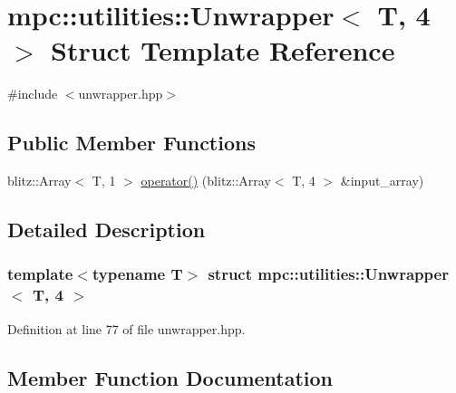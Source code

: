 \hypertarget{structmpc_1_1utilities_1_1_unwrapper_3_01_t_00_014_01_4}{}\section{mpc\+:\+:utilities\+:\+:Unwrapper$<$ T, 4 $>$ Struct Template Reference}
\label{structmpc_1_1utilities_1_1_unwrapper_3_01_t_00_014_01_4}


{\ttfamily \#include $<$unwrapper.\+hpp$>$}

\subsection*{Public Member Functions}
\begin{DoxyCompactItemize}
\item 
blitz\+::\+Array$<$ T, 1 $>$ \mbox{\hyperlink{structmpc_1_1utilities_1_1_unwrapper_3_01_t_00_014_01_4_a288f292a07352d80d6ea251b01b0a006}{operator()}} (blitz\+::\+Array$<$ T, 4 $>$ \&input\+\_\+array)
\end{DoxyCompactItemize}


\subsection{Detailed Description}
\subsubsection*{template$<$typename T$>$\newline
struct mpc\+::utilities\+::\+Unwrapper$<$ T, 4 $>$}



Definition at line 77 of file unwrapper.\+hpp.



\subsection{Member Function Documentation}
\mbox{\label{structmpc_1_1utilities_1_1_unwrapper_3_01_t_00_014_01_4_a288f292a07352d80d6ea251b01b0a006}} 
